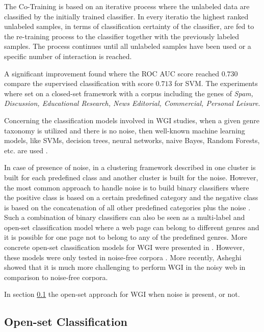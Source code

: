 The Co-Training is based on an iterative process where the unlabeled data are classified by the initially trained classifier. In every iteratio the highest ranked unlabeled samples, in terms of classification certainty of the classifier, are fed to the re-training process to the classifier together with the previously labeled samples. The process continues until all unlabeled samples have been used or a specific number of interaction is reached. 

A significant improvement found where the ROC AUC score reached $0.730$ compare the supervised classification with score $0.713$ for SVM. The experiments where set on a closed-set framework with a corpus including the genes of \textit{Spam, Discussion, Educational Research, News Editorial, Commercial, Personal Leisure}.

Concerning the classification models involved in WGI studies, when a given genre taxonomy is utilized and there is no noise, then well-known machine learning models, like SVMs, decision trees, neural networks, naive Bayes, Random Forests, etc. are used \parencite{Lim2005,santini2007automatic,kanaris2009learning,jebari2015combination,sharoff2010web}. 

In case of presence of  noise, in a clustering framework described in \parencite{kennedy2005automatic} one cluster is built for each predefined class and another cluster is built for the noise. However, the most  common approach to handle noise is to build binary classifiers where the positive class is based on a certain predefined category and the negative class is based on the concatenation of  all other predefined categories plus the noise \parencite{kennedy2005automatic,dong2006binary,levering2008using}. Such a combination of binary classifiers can also be seen as a multi-label and open-set classification model where a web page can belong to different genres and it is possible for one page not to belong to any of the predefined genres. More concrete open-set  classification models for WGI were presented in \parencite{stubbe2007genre,pritsos2013open}. However, these models were only tested in noise-free corpora \parencite{pritsos2015clef}. More  recently, Asheghi \parencite{Asheghi2015} showed that it is much more challenging to perform WGI in the noisy web in comparison to noise-free corpora.

In section \ref{chap:relevant_work:sec:openset_and_noise} the open-set approach for WGI when noise is present, or not.

\subsection{Open-set Classification}
\label{chap:relevant_work:sec:openset_and_noise}

